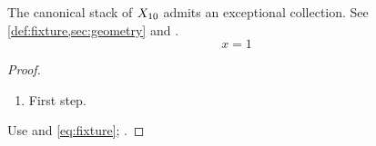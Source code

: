 \begin{theorem}\label{thm:stable}
The canonical stack of $X_{10}$ admits an exceptional collection.
See \cref{def:fixture,sec:geometry} and \cite[Chapter {2}]{Source}.
\begin{equation}\label{eq:fixture}x=1\end{equation}
\end{theorem}
\begin{proof}
\begin{enumerate}\item First step.\end{enumerate}
Use  and \eqref{eq:fixture}; \textcite{Source}.
\end{proof}

